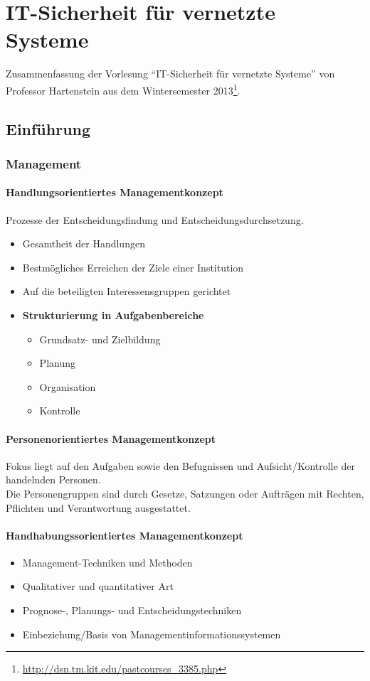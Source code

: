 \chapter{IT-Sicherheit für vernetzte Systeme}
Zusammenfassung der Vorlesung  "`IT-Sicherheit für vernetzte Systeme"' von Professor Hartenstein aus dem Wintersemester 2013\footnote{\url{http://dsn.tm.kit.edu/pastcourses_3385.php}}.

\section{Einführung}

\subsection{Management}

\subsubsection{Handlungsorientiertes Managementkonzept}
Prozesse der Entscheidungsfindung und Entscheidungsdurchsetzung.
\begin{itemize}
	\item Gesamtheit der Handlungen
	\item Bestmögliches Erreichen der Ziele einer Institution
	\item Auf die beteiligten Interessensgruppen gerichtet
	\item \textbf{Strukturierung in Aufgabenbereiche}
	\begin{itemize}
		\item Grundsatz- und Zielbildung
		\item Planung
		\item Organisation
		\item Kontrolle
	\end{itemize}
\end{itemize}

\subsubsection{Personenorientiertes Managementkonzept}
Fokus liegt auf den Aufgaben sowie den Befugnissen und Aufsicht/Kontrolle der handelnden Personen.\\
Die Personengruppen sind durch Gesetze, Satzungen oder Aufträgen mit Rechten, Pflichten und Verantwortung ausgestattet.

\subsubsection{Handhabungssorientiertes Managementkonzept}
\begin{itemize}
	\item Management-Techniken und Methoden
	\item Qualitativer und quantitativer Art
	\item Prognose-, Planungs- und Entscheidungstechniken
	\item Einbeziehung/Basis von Managementinformationssystemen
\end{itemize}


